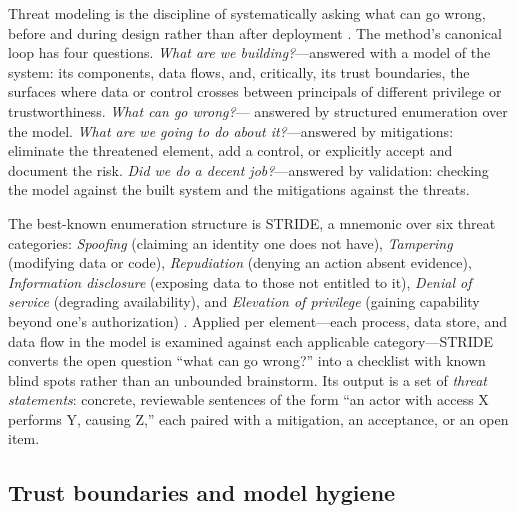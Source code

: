 Threat modeling is the discipline of systematically asking what can
go wrong, before and during design rather than after deployment
\cite{shostack}. The method's canonical loop has four questions.
\emph{What are we building?}---answered with a model of the system:
its components, data flows, and, critically, its trust boundaries,
the surfaces where data or control crosses between principals of
different privilege or trustworthiness. \emph{What can go wrong?}---
answered by structured enumeration over the model. \emph{What are we
going to do about it?}---answered by mitigations: eliminate the
threatened element, add a control, or explicitly accept and document
the risk. \emph{Did we do a decent job?}---answered by validation:
checking the model against the built system and the mitigations
against the threats.

The best-known enumeration structure is STRIDE, a mnemonic over six
threat categories: \emph{Spoofing} (claiming an identity one does
not have), \emph{Tampering} (modifying data or code),
\emph{Repudiation} (denying an action absent evidence),
\emph{Information disclosure} (exposing data to those not entitled
to it), \emph{Denial of service} (degrading availability), and
\emph{Elevation of privilege} (gaining capability beyond one's
authorization) \cite{shostack}. Applied per element---each process,
data store, and data flow in the model is examined against each
applicable category---STRIDE converts the open question ``what can
go wrong?'' into a checklist with known blind spots rather than an
unbounded brainstorm. Its output is a set of \emph{threat
statements}: concrete, reviewable sentences of the form ``an actor
with access X performs Y, causing Z,'' each paired with a
mitigation, an acceptance, or an open item.

\subsection{Trust boundaries and model hygiene}\label{ch02:threat-boundaries}


